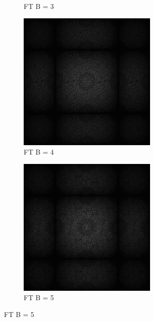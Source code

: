 \begin{figure}[H]
\begin{subfigure}[b]{0.2\linewidth}
      \caption{FT B = 3}
      \label{pic:fftB_3}
    \end{subfigure}
    \begin{subfigure}[b]{0.2\linewidth}
      \includegraphics[width=\linewidth]{content/TemporalerAlg/Bilder/Sorting/DiffDimensions/4/seed_debug_5.0_small.png}
      \caption{FT B = 4}
      \label{pic:fftB_4}
    \end{subfigure}
    \begin{subfigure}[b]{0.2\linewidth}
        \includegraphics[width=\linewidth]{content/TemporalerAlg/Bilder/Sorting/DiffDimensions/5/seed_debug_5.0_small.png}
        \caption{FT B = 5}
        \label{pic:fftB_5}
    \end{subfigure}
    

\end{figure}
